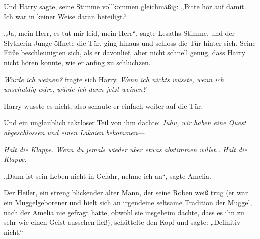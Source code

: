 Und Harry sagte, seine Stimme vollkommen gleichmäßig: „Bitte hör auf damit. Ich war in keiner Weise daran beteiligt.“

„Ja, mein Herr, es tut mir leid, mein Herr“, sagte Lesaths Stimme, und der Slytherin-Junge öffnete die Tür, ging hinaus und schloss die Tür hinter sich. Seine Füße beschleunigten sich, als er davonlief, aber nicht schnell genug, dass Harry nicht hören konnte, wie er anfing zu schluchzen.

\emph{Würde ich weinen?} fragte sich Harry. \emph{Wenn ich nichts wüsste, wenn ich unschuldig wäre, würde ich dann jetzt weinen?}

Harry wusste es nicht, also schaute er einfach weiter auf die Tür.

Und ein unglaublich taktloser Teil von ihm dachte: \emph{Juhu, wir haben eine Quest abgeschlossen und einen Lakaien bekommen}—

\emph{Halt die Klappe. Wenn du jemals wieder über etwas abstimmen willst… Halt die Klappe.}


„Dann ist sein Leben nicht in Gefahr, nehme ich an“, sagte Amelia.

Der Heiler, ein streng blickender alter Mann, der seine Roben weiß trug (er war ein Muggelgeborener und hielt sich an irgendeine seltsame Tradition der Muggel, nach der Amelia nie gefragt hatte, obwohl sie insgeheim dachte, dass es ihn zu sehr wie einen Geist aussehen ließ), schüttelte den Kopf und sagte: „Definitiv nicht.“

